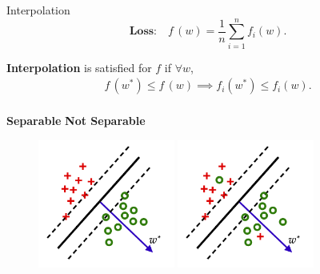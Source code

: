 \documentclass[notheorems]{beamer}
\begin{document}
    \begin{frame}{Interpolation}
        \[ \textbf{Loss:} \quad f \,(w) = \frac{1}{n}\sum_{i=1}^n f_i(w). \]

        \textbf{Interpolation} is satisfied for \( f \) if $\forall w$,
        \begin{align*}
            f\,(w^*) \leq f\,(w) \implies f_i(w^*) \leq f_i(w).\\
        \end{align*}

        {\hspace{0.125\textwidth} \large{\textbf{Separable} \hspace{0.3\textwidth} \textbf{Not Separable}}}
        \begin{figure}
            \centering
            \includegraphics[width=0.4\textwidth]{figures/separable_2}
            \hspace{0.1\textwidth}
            \includegraphics[width=0.4\textwidth]{figures/not_separable_2}
        \end{figure}

    \end{frame}
\end{document}
